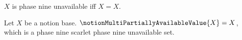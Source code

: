 

\begin{definition}\label{notion_multi_unavailable}
    $X$ is phase nine unavailable iff $X=X$.
\end{definition}

\begin{definition}\label{notion_multi_partially_available_value}
    Let $X$ be a notion base.
    $\notionMultiPartiallyAvailableValue{X}=X$, which is a
        phase nine scarlet phase nine unavailable set.
\end{definition}
